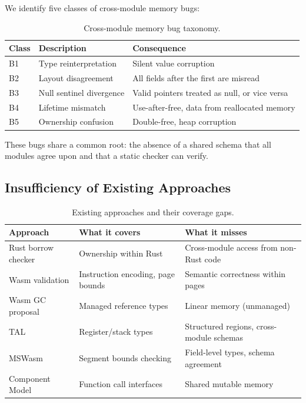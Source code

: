 \documentclass[sigplan,nonacm,screen]{acmart}
\begin{document}
We identify five classes of cross-module memory bugs:

\begin{table}[ht]
\centering
\caption{Cross-module memory bug taxonomy.}
\label{tab:bugs}
\begin{tabular}{@{}llp{4.2cm}@{}}
\toprule
\textbf{Class} & \textbf{Description} & \textbf{Consequence} \\
\midrule
B1 & Type reinterpretation & Silent value corruption \\
B2 & Layout disagreement & All fields after the first are misread \\
B3 & Null sentinel divergence & Valid pointers treated as null, or vice versa \\
B4 & Lifetime mismatch & Use-after-free, data from reallocated memory \\
B5 & Ownership confusion & Double-free, heap corruption \\
\bottomrule
\end{tabular}
\end{table}

These bugs share a common root: the absence of a shared schema that all
modules agree upon and that a static checker can verify.

\subsection{Insufficiency of Existing Approaches}

\begin{table}[ht]
\centering
\caption{Existing approaches and their coverage gaps.}
\label{tab:existing}
\begin{tabular}{@{}lp{3cm}p{3.5cm}@{}}
\toprule
\textbf{Approach} & \textbf{What it covers} & \textbf{What it misses} \\
\midrule
Rust borrow checker & Ownership within Rust & Cross-module access from non-Rust code \\
Wasm validation & Instruction encoding, page bounds & Semantic correctness within pages \\
Wasm GC proposal & Managed reference types & Linear memory (unmanaged) \\
TAL~\cite{morrisett1999} & Register/stack types & Structured regions, cross-module schemas \\
MSWasm~\cite{disselkoen2022} & Segment bounds checking & Field-level types, schema agreement \\
Component Model~\cite{wasmcomponent2024} & Function call interfaces & Shared mutable memory \\
\bottomrule
\end{tabular}
\end{table}
\end{document}
